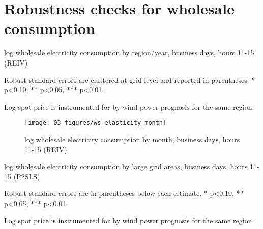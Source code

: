 \section{Robustness checks for wholesale consumption}
\label{app:robustness_wholesale}
\begin{table}[H]
\centering
\begin{threeparttable}
  \caption{log wholesale electricity consumption by region/year, business days, hours 11-15 (REIV)}
  \label{tab:ws_region_year}
  \footnotesize
    
    \begin{tablenotes}
    \item Robust standard errors are clustered at grid level and reported in parentheses. * p<0.10, ** p<0.05, *** p<0.01.
    \item Log spot price is instrumented for by wind power prognosis for the same region.
  \end{tablenotes}
\end{threeparttable}
\end{table}

\begin{figure}[H]
  \centering
  \caption{log wholesale electricity consumption by month, business days, hours 11-15 (REIV)}
    \label{fig:ws_elasticity_month}
  \texttt{[image: 03\_figures/ws\_elasticity\_month]}
\end{figure}


\begin{landscape}
\begin{table}[H]
\centering
\begin{threeparttable}
  \caption{log wholesale electricity consumption by large grid areas, business days, hours 11-15 (P2SLS)}
  \label{tab:ws_grids_large}
  \footnotesize
    
    \begin{tablenotes}
    \item Robust standard errors are in parentheses below each estimate. * p<0.10, ** p<0.05, *** p<0.01.
    \item Log spot price is instrumented for by wind power prognosis for the same region.
  \end{tablenotes}
\end{threeparttable}
\end{table}

\end{landscape}
